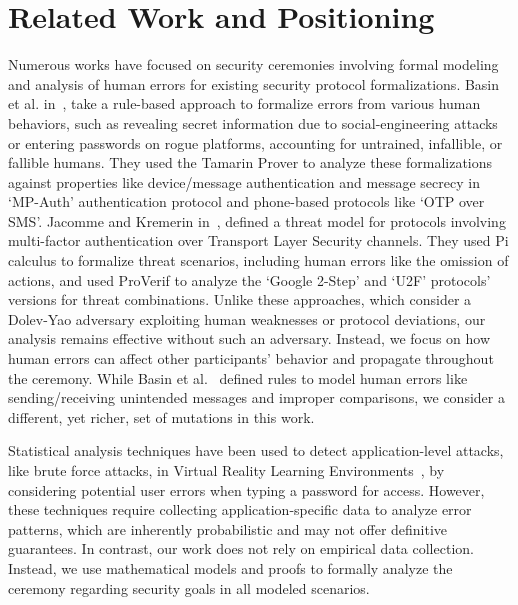 \section{Related Work and Positioning}
\label{Sec:RelatedWork}

Numerous works have focused on security ceremonies involving formal modeling and analysis of human errors for existing security protocol formalizations. Basin et al. in~\cite{basin2016modeling}, take a rule-based approach to formalize errors from various human behaviors, such as revealing secret information due to social-engineering attacks or entering passwords on rogue platforms, accounting for untrained, infallible, or fallible humans. They used the Tamarin Prover to analyze these formalizations against properties like device/message authentication and message secrecy in `MP-Auth' authentication protocol and phone-based protocols like `OTP over SMS'. Jacomme and Kremerin in~\cite{jacomme2021extensive}, defined a threat model for protocols involving multi-factor authentication over Transport Layer Security channels. They used Pi calculus to formalize threat scenarios, including human errors like the omission of actions, and used ProVerif to analyze the `Google 2-Step' and `U2F' protocols' versions for threat combinations. Unlike these approaches, which consider a Dolev-Yao adversary exploiting human weaknesses or protocol deviations, our analysis remains effective without such an adversary. Instead, we focus on how human errors can affect other participants' behavior and propagate throughout the ceremony. While Basin et al.~\cite{basin2016modeling} defined rules to model human errors like sending/receiving unintended messages and improper comparisons, we consider a different, yet richer, set of mutations in this work.

Statistical analysis techniques have been used to detect application-level attacks, like brute force attacks, in Virtual Reality Learning Environments~\cite{valluripally2022detection}, by considering potential user errors when typing a password for access. However, these techniques require collecting application-specific data to analyze error patterns, which are inherently probabilistic and may not offer definitive guarantees. In contrast, our work does not rely on empirical data collection. Instead, we use mathematical models and proofs to formally analyze the ceremony regarding security goals in all modeled scenarios. 

